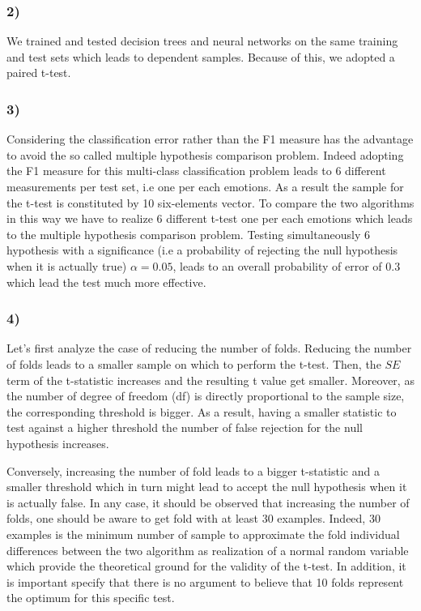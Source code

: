 \documentclass{article}
\begin{document}
\subsubsection*{2)}
We trained and tested decision trees and neural networks on the same training and test sets which leads to dependent samples. Because of this, we adopted a paired t-test.

\subsubsection*{3)}
Considering the classification error rather than the F1 measure has the advantage to avoid the so called multiple hypothesis comparison problem. Indeed adopting the F1 measure for this multi-class classification problem leads to 6 different measurements per test set, i.e one per each emotions. As a result the sample for the t-test is constituted by 10 six-elements vector. To compare the two algorithms in this way we have to realize 6 different t-test one per each emotions which leads to the multiple hypothesis comparison problem. Testing simultaneously 6 hypothesis with a significance (i.e a probability of rejecting the null hypothesis when it is actually true) $\alpha=0.05$, leads to an overall probability of error of $0.3$ which lead the test much more effective.

\subsubsection*{4)}
Let's first analyze the case of reducing the number of folds. Reducing the number of folds leads to a smaller sample on which to perform the t-test. Then, the $SE$ term of the t-statistic increases and the resulting t value get smaller. Moreover, as the number of degree of freedom (df) is directly proportional to the sample size, the corresponding threshold is bigger. As a result, having a smaller statistic to test against a higher threshold the number of false rejection for the null hypothesis increases. 

Conversely, increasing the number of fold leads to a bigger t-statistic and a smaller threshold which in turn might lead to accept the null hypothesis when it is actually false. In any case, it should be observed that increasing the number of folds, one should be aware to get fold with at least 30 examples. Indeed, 30 examples is the minimum number of sample to approximate the fold individual differences between the two algorithm as realization of a normal random variable which provide the theoretical ground for the validity of the t-test. In addition, it is important specify that there is no argument to believe that 10 folds represent the optimum for this specific test.
\end{document}
